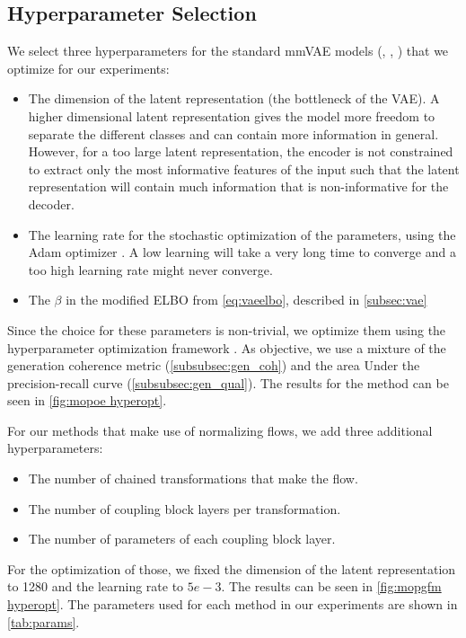 \subsection{Hyperparameter Selection}
We select three hyperparameters for the standard mmVAE models (, , ) that we optimize for our experiments:

\begin{itemize}
    \item The dimension of the latent representation (the bottleneck of the VAE).
    A higher dimensional latent representation gives the model more freedom to separate the different classes and can contain more information in general.
    However, for a too large latent representation, the encoder is not constrained to extract only the most informative features of the input such that the latent representation will contain much information that is non-informative for the decoder.
    \item The learning rate for the stochastic optimization of the parameters, using the Adam optimizer \citep{kingma_adam_2017}.
    A low learning will take a very long time to converge and a too high learning rate might never converge.
    \item The $\beta$ in the modified ELBO from \cref{eq:vaeelbo}, described in \cref{subsec:vae}
\end{itemize}

Since the choice for these parameters is non-trivial, we optimize them using the hyperparameter optimization framework  \citep{akiba_optuna_2019}.
As objective, we use a mixture of the generation coherence metric (\cref{subsubsec:gen_coh}) and the area Under the precision-recall curve (\cref{subsubsec:gen_qual}).
The results for the  method can be seen in \cref{fig:mopoe hyperopt}.

For our methods that make use of normalizing flows, we add three additional hyperparameters:
\begin{itemize}
    \item The number of chained transformations that make the flow.
    \item The number of coupling block layers per transformation.
    \item The number of parameters of each coupling block layer.
\end{itemize}

For the optimization of those, we fixed the dimension of the latent representation to 1280 and the learning rate to $5e-3$.
The results can be seen in \cref{fig:mopgfm hyperopt}.
The parameters used for each method in our experiments are shown in \cref{tab:params}.


